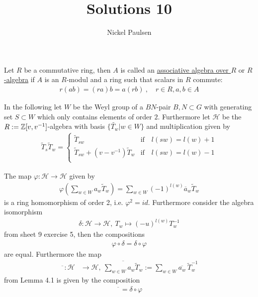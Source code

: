 \documentclass[]{article}
\title{Solutions 10}
\author{Nickel Paulsen}
\begin{document}
\maketitle



\begin{definition*}
   Let \(R\) be a commutative ring, then \(A\) is called an \underline{associative algebra over \(R\)} or \underline{\(R\)-algebra} if \(A\) is an \(R\)-modul and a ring 
   such that scalars in \(R\) commute:
   \begin{align*}
     r ( a b) = (r a) b = a(rb) \ , \quad r \in R, a,b \in A
   \end{align*}
\end{definition*}

In the following let \(W\) be the Weyl group of a \(BN\)-pair \(B,N \subset G\) with generating set \(S \subset W\) which only contains elements
of order \(2\). Furthermore let \(\mathscr{H}\) be the \(R:={\mathbb{Z}}[v,v^{-1}]\)-algebra with basis \(\{\widetilde{T_w} | w \in W\}\) and multiplication given by
\begin{align*}
    \widetilde{T}_{s} \widetilde{T}_w =
    \begin{cases}
        \widetilde{T}_{s w}& \text{if} \quad l(s w) = l(w) +1 \\
        \widetilde{T}_{s w}+(v-v^{-1})\widetilde{T}_w & \text{if} \quad l(s w)= l(w)-1 \\
    \end{cases}
\end{align*}

\begin{exercise}
    The map \(\varphi : \mathscr{H} \rightarrow \mathscr{H}\) given by
    \begin{align*}
        \varphi\left(\sum_{w \in W}^{}a_w \widetilde{T}_w\right) = \sum_{w \in W}^{}(-1)^{l(w)}\overline{a}_w\widetilde{T}_w
    \end{align*}
    is a ring homomorphism of order 2, i.e. \(\varphi^2 = id\). Furthermore consider the algebra isomorphism
    \begin{align*}
        \delta: \mathscr{H} \rightarrow \mathscr{H}, \ T_w \mapsto (-u)^{l(w)} T_w^{-1}
    \end{align*}
    from sheet 9 exercise 5, then the compositions 
    \begin{align*}
        \varphi \circ \delta = \delta \circ \varphi
    \end{align*}
    are equal. Furthermore the map 
    \begin{align*}
        \overline{\phantom{x}}:\mathscr{H} &\rightarrow \mathscr{H}, \ \overline{\sum_{w \in W}^{}a_w \widetilde{T}_w} := \sum_{w \in W}^{} \overline{a_w} \ \widetilde{T}_w^{-1} 
    \end{align*}
    from Lemma 4.1 is given by the composition
    \begin{align*}
        \overline{\phantom{x}} = \delta \circ \varphi
    \end{align*}
\end{exercise}
\end{document}
